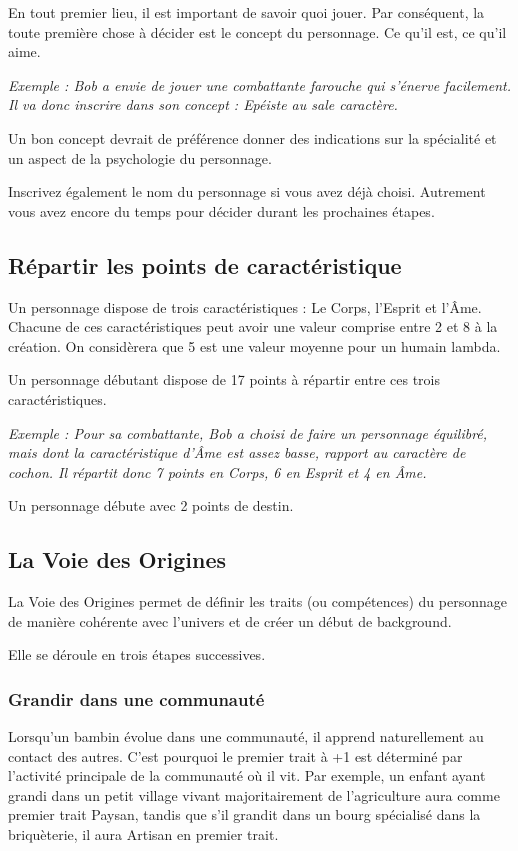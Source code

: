 En tout premier lieu, il est important de savoir quoi jouer. Par conséquent, la toute première chose à décider est le concept du personnage. Ce qu'il est, ce qu'il aime.

\emph{Exemple : Bob a envie de jouer une combattante farouche qui s'énerve facilement. Il va donc inscrire dans son concept : Epéiste au sale caractère.}

Un bon concept devrait de préférence donner des indications sur la spécialité et un aspect de la psychologie du personnage.

Inscrivez également le nom du personnage si vous avez déjà choisi. Autrement vous avez encore du temps pour décider durant les prochaines étapes.

\subsection{Répartir les points de caractéristique}

Un personnage dispose de trois caractéristiques : Le Corps, l'Esprit et l'Âme. Chacune de ces caractéristiques peut avoir une valeur comprise entre 2 et 8 à la création. On considèrera que 5 est une valeur moyenne pour un humain lambda.

Un personnage débutant dispose de 17 points à répartir entre ces trois caractéristiques.

\emph{Exemple : Pour sa combattante, Bob a choisi de faire un personnage équilibré, mais dont la caractéristique d'Âme est assez basse, rapport au caractère de cochon. Il répartit donc 7 points en Corps, 6 en Esprit et 4 en Âme.}

Un personnage débute avec 2 points de destin.

\subsection{La Voie des Origines}

La Voie des Origines permet de définir les traits (ou compétences) du personnage de manière cohérente avec l'univers et de créer un début de background.

Elle se déroule en trois étapes successives.

\subsubsection*{Grandir dans une communauté}

Lorsqu'un bambin évolue dans une communauté, il apprend naturellement au contact des autres. C'est pourquoi le premier trait à +1 est déterminé par l'activité principale de la communauté où il vit. Par exemple, un enfant ayant grandi dans un petit village vivant majoritairement de l'agriculture aura comme premier trait Paysan, tandis que s'il grandit dans un bourg spécialisé dans la briquèterie, il aura Artisan en premier trait.

